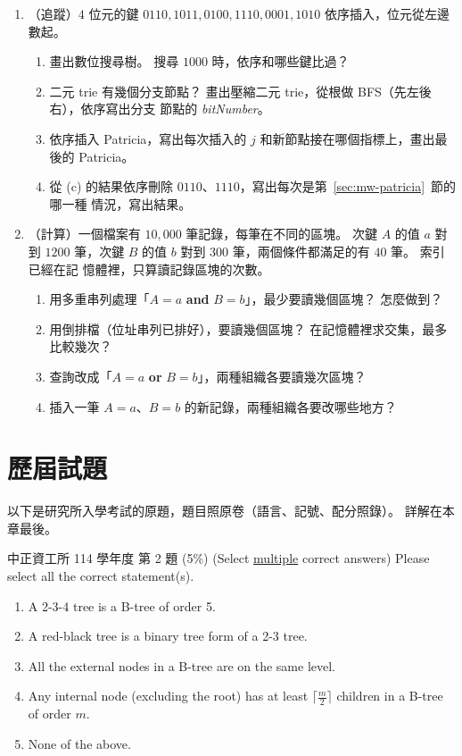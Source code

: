 \begin{enumerate}
\item （追蹤）$4$ 位元的鍵 $0110, 1011, 0100, 1110, 0001, 1010$ 依序插入，位元從左邊數起。
\begin{enumerate}
\item 畫出數位搜尋樹。 搜尋 $1000$ 時，依序和哪些鍵比過？
\item 二元 trie 有幾個分支節點？ 畫出壓縮二元 trie，從根做 BFS（先左後右），依序寫出分支
節點的 \textit{bitNumber}。
\item 依序插入 Patricia，寫出每次插入的 $j$ 和新節點接在哪個指標上，畫出最後的 Patricia。
\item 從 (c) 的結果依序刪除 $0110$、$1110$，寫出每次是第~\ref{sec:mw-patricia}~節的哪一種
情況，寫出結果。
\end{enumerate}

\item （計算）一個檔案有 $10{,}000$ 筆記錄，每筆在不同的區塊。 次鍵 $A$ 的值 $a$ 對到
$1200$ 筆，次鍵 $B$ 的值 $b$ 對到 $300$ 筆，兩個條件都滿足的有 $40$ 筆。 索引已經在記
憶體裡，只算讀記錄區塊的次數。
\begin{enumerate}
\item 用多重串列處理「$A = a$ \textbf{and} $B = b$」，最少要讀幾個區塊？ 怎麼做到？
\item 用倒排檔（位址串列已排好），要讀幾個區塊？ 在記憶體裡求交集，最多比較幾次？
\item 查詢改成「$A = a$ \textbf{or} $B = b$」，兩種組織各要讀幾次區塊？
\item 插入一筆 $A = a$、$B = b$ 的新記錄，兩種組織各要改哪些地方？
\end{enumerate}

\end{enumerate}

\section{歷屆試題}
\label{sec:mw-pastexam}

以下是研究所入學考試的原題，題目照原卷（語言、記號、配分照錄）。 詳解在本章最後。

\begin{pastexam}[label={px:mw-1}]{中正資工所 114 學年度 第 2 題}
(5\%) (Select \underline{multiple} correct answers) Please select all the correct statement(s).
\begin{enumerate}[label=(\alph*), topsep=4pt]
\item A 2-3-4 tree is a B-tree of order 5.
\item A red-black tree is a binary tree form of a 2-3 tree.
\item All the external nodes in a B-tree are on the same level.
\item Any internal node (excluding the root) has at least $\lceil \frac{m}{2}\rceil$ children in a B-tree of order $m$.
\item None of the above.
\end{enumerate}
\end{pastexam}


